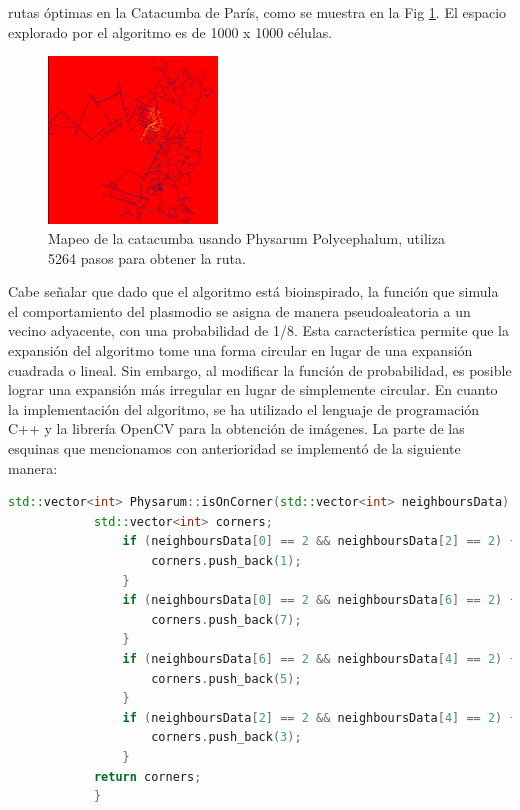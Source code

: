             rutas \'optimas en la Catacumba de Par\'is, como se muestra en la Fig \ref{fig:Catacomb}. El espacio
            explorado por el algoritmo es de 1000 x 1000 c\'elulas.
        \vskip 0.2cm
        \begin{figure}[htbp]
            \centerline{\includegraphics[width=0.40\textwidth]{./images/desarrollo/physarum/CatacoumbParis.png}}
            \caption{Mapeo de la catacumba usando Physarum Polycephalum, utiliza 5264 pasos para obtener la ruta.}
            \label{fig:Catacomb}
        \end{figure}
        Cabe se\~nalar que dado que el algoritmo est\'a bioinspirado, la funci\'on que simula el comportamiento del plasmodio 
            se asigna de manera pseudoaleatoria a un vecino adyacente, con una probabilidad de 1/8. Esta caracter\'istica permite 
            que la expansi\'on del algoritmo tome una forma circular en lugar de una expansi\'on cuadrada o lineal. Sin embargo, al 
            modificar la funci\'on de probabilidad, es posible lograr una expansi\'on m\'as irregular en lugar de simplemente circular.
        \clearpage
        En cuanto la implementaci\'on del algoritmo, se ha utilizado el lenguaje de programaci\'on C++ y la librer\'ia OpenCV para la 
            obtenci\'on de im\'agenes. La parte de las esquinas que mencionamos con anterioridad se implement\'o de la siguiente manera: 
        \begin{lstlisting}[language={C++}, caption={Implementaci\'on del problema de las esquinas}, label={Script}]
            std::vector<int> Physarum::isOnCorner(std::vector<int> neighboursData) {
            std::vector<int> corners;
                if (neighboursData[0] == 2 && neighboursData[2] == 2) {
                    corners.push_back(1);
                }
                if (neighboursData[0] == 2 && neighboursData[6] == 2) {
                    corners.push_back(7);
                }
                if (neighboursData[6] == 2 && neighboursData[4] == 2) {
                    corners.push_back(5);
                }
                if (neighboursData[2] == 2 && neighboursData[4] == 2) {
                    corners.push_back(3);
                }
            return corners;
            }
        \end{lstlisting}
